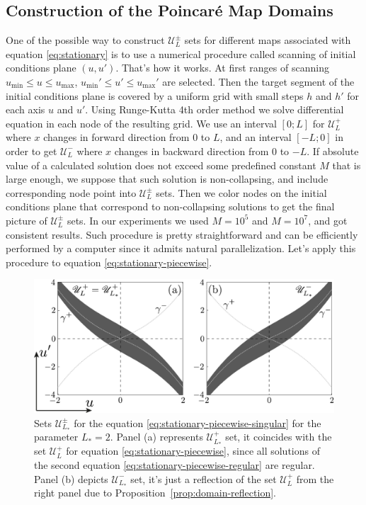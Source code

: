 \subsection{Construction of the Poincar\'e Map Domains}

One of the possible way to construct $\mathscr{U}_L^{\pm}$ sets for different maps associated with equation \eqref{eq:stationary} is to use a numerical procedure called scanning of initial conditions plane $(u, u')$.
That's how it works.
At first ranges of scanning $u_{\min} \le u \le u_{\max}$, $u_{\min}' \le u' \le u_{\max}'$ are selected.
Then the target segment of the initial conditions plane is covered by a uniform grid with small steps $h$ and $h'$ for each axis $u$ and $u'$.
Using Runge-Kutta 4th order method we solve differential equation in each node of the resulting grid.
We use an interval $[0; L]$ for $\mathscr{U}_L^+$ where $x$ changes in forward direction from $0$ to $L$, and an interval $[-L; 0]$ in order to get $\mathscr{U}_L^-$ where $x$ changes in backward direction from $0$ to $-L$.
If absolute value of a calculated solution does not exceed some predefined constant $M$ that is large enough, we suppose that such solution is non-collapsing, and include corresponding node point into $\mathscr{U}_L^{\pm}$ sets.
Then we color nodes on the initial conditions plane that correspond to non-collapsing solutions to get the final picture of $\mathscr{U}_L^{\pm}$ sets.
In our experiments we used $M = 10^5$ and $M = 10^7$, and got consistent results.
Such procedure is pretty straightforward and can be efficiently performed by a computer since it admits natural parallelization.
Let's apply this procedure to equation \eqref{eq:stationary-piecewise}.

\begin{figure}[h]
\centering
	\includegraphics[scale = 1]{pic/Poincare map domain for piecewise singular equation}
	\caption{
		Sets $\mathscr{U}_{L_*}^{\pm}$ for the equation \eqref{eq:stationary-piecewise-singular} for the parameter $L_* = 2$.
		Panel (a) represents $\mathscr{U}_{L_*}^+$ set, it coincides with the set $\mathscr{U}_L^+$ for equation \eqref{eq:stationary-piecewise}, since all solutions of the second equation \eqref{eq:stationary-piecewise-regular} are regular.
		Panel (b) depicts $\mathscr{U}_{L_*}^-$ set, it's just a reflection of the set $\mathscr{U}_L^+$ from the right panel due to Proposition~\ref{prop:domain-reflection}.
	}
\label{fig:poincare-map-domain-piecewise}
\end{figure}

